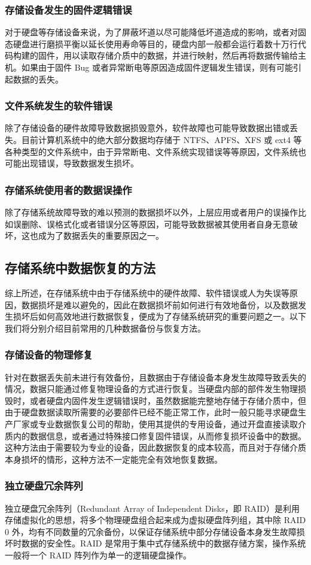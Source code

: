 \subsubsection{存储设备发生的固件逻辑错误}
对于硬盘等存储设备来说，为了屏蔽坏道以尽可能降低坏道造成的影响，或者对固态硬盘进行磨损平衡以延长使用寿命等目的，硬盘内部一般都会运行着数十万行代码构建的固件\cite{bairavasundaram2008analysis}，用以读取存储介质中的数据，并进行映射，然后再将数据传输给主机。如果由于固件 Bug 或者异常断电等原因造成固件逻辑发生错误，则有可能引起数据的丢失。
\subsubsection{文件系统发生的软件错误}
除了存储设备的硬件故障导致数据损毁意外，软件故障也可能导致数据出错或丢失。目前计算机系统中的绝大部分数据均存储于 NTFS、APFS、XFS 或 ext4 等各种类型的文件系统中，由于异常断电、文件系统实现错误等等原因，文件系统也可能出现错误，导致数据发生损坏。
\subsubsection{存储系统使用者的数据误操作}
除了存储系统故障导致的难以预测的数据损坏以外，上层应用或者用户的误操作比如误删除、误格式化或者错误分区等原因，可能导致数据被其使用者自身无意破坏，这也成为了数据丢失的重要原因之一。
\subsection{存储系统中数据恢复的方法}
综上所述，在存储系统中由于存储系统中的硬件故障、软件错误或人为失误等原因，数据损坏是难以避免的，因此在数据损坏前如何进行有效地备份，以及数据发生损坏后如何高效地进行数据恢复，便成为了存储系统研究的重要问题之一。以下我们将分别介绍目前常用的几种数据备份与恢复方法。
\subsubsection{存储设备的物理修复}
针对在数据丢失前未进行有效备份，且数据由于存储设备本身发生故障导致丢失的情况，数据只能通过修复物理设备的方式进行恢复。当硬盘内部的部件发生物理损毁时，或者硬盘内固件发生逻辑错误时，虽然数据能完整地存储于存储介质中，但由于硬盘数据读取所需要的必要部件已经不能正常工作，此时一般只能寻求硬盘生产厂家或专业数据恢复公司的帮助，使用其提供的专用设备，通过开盘直接读取介质内的数据信息，或者通过特殊接口修复固件错误，从而修复损坏设备中的数据。这种方法由于需要较为专业的设备，因此数据恢复的成本较高，而且对于存储介质本身损坏的情形，这种方法不一定能完全有效地恢复数据。
\subsubsection{独立硬盘冗余阵列}
独立硬盘冗余阵列（Redundant Array of Independent Disks，即 RAID）是利用存储虚拟化的思想，将多个物理硬盘组合起来成为虚拟硬盘阵列组，其中除 RAID 0 外，均有不同数量的冗余备份，以保证存储系统中部分存储设备本身发生故障损坏时数据的安全性。RAID 是常用于集中式存储系统中的数据存储方案，操作系统一般将一个 RAID 阵列作为单一的逻辑硬盘操作。
